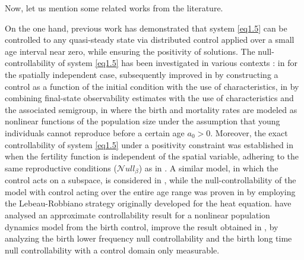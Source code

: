 \documentclass[10pt, a4]{amsart}
\newcounter{assu}
\theoremstyle{plain}
\theoremstyle{definition}
\theoremstyle{remark}
\numberwithin{equation}{section}
\begin{document}
Now, let us mention some related works from the literature.

On the one hand, previous work  \cite{ref3} has demonstrated that system \eqref{eq1.5} can be controlled to any quasi-steady state via distributed control applied over a small age interval near zero, while ensuring the positivity of solutions.  The null-controllability of system \eqref{eq1.5} has been investigated in various contexts : in \cite{ref19} for the spatially independent case, subsequently improved in \cite{ref18} by constructing a control as a function of the initial condition with the use of characteristics, in \cite{ref20} by combining final-state observability estimates with the use of characteristics and the associated semigroup, in \cite{ref25} where the birth and mortality rates are modeled as nonlinear functions of the population size under the assumption that young individuals cannot reproduce before a certain age \(a_0>0\). Moreover, the exact controllability of system \eqref{eq1.5} under a positivity constraint was established in \cite{ref3} when the fertility function is independent of the spatial variable, adhering to the same reproductive conditions ($\mathcal{N}ull_{\beta}$) as in \cite{ref18}. A similar model, in which the control acts on a subspace, is considered in \cite{ref14, ref21, ref23, ref26}, while the null-controllability of the model with control acting over the entire age range was proven in \cite{ref24} by employing the Lebeau-Robbiano strategy originally developed for the heat equation. \cite{ref71} have analysed an approximate controllability result for a nonlinear
population dynamics model from the birth control, \cite{ref27} improve the result obtained in \cite{ref71}, by analyzing the birth lower frequency null controllability and the birth long time null controllability with a control domain  only measurable.
\end{document}
